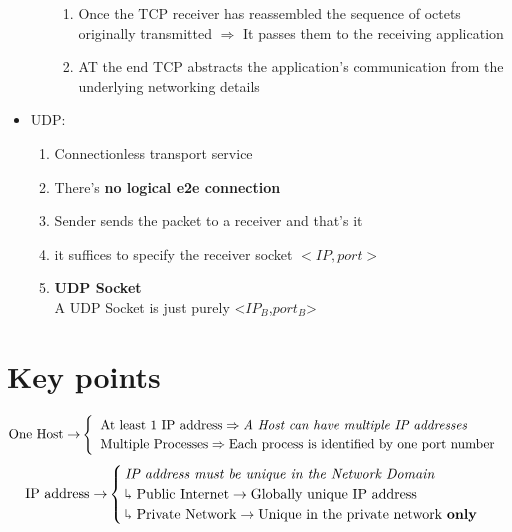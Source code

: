 \begin{itemize}
\begin{enumerate}
\begin{enumerate}
\item Once the TCP receiver has reassembled the sequence of octets originally transmitted $\Rightarrow$ It passes them to the receiving application
\item AT the end TCP abstracts the application's communication from the underlying networking details
\end{enumerate}
\end{enumerate}
\item UDP:
\begin{enumerate}
\item Connectionless transport service
\item There's \textbf{no logical e2e connection}
\item Sender sends the packet to a receiver and that's it
\item it suffices to specify the receiver socket $<IP,port>$
\item
\begin{definition}{\textbf{UDP Socket}\\}
A UDP Socket is just purely <$IP_B$,$port_B$>
\end{definition}
\end{enumerate}
\end{itemize}

\section{Key points}
\begin{equation}{\text{One Host}\rightarrow}
\begin{cases}
\text{ At least 1 IP address} \Rightarrow \text{\emph{A Host can have multiple IP addresses}}\\
\text{ Multiple Processes} \Rightarrow \text{Each process is identified by one port number}
\end{cases}
\end{equation}
\begin{equation}{\text{IP address}\rightarrow}
\begin{cases}
\text{\emph{IP address must be unique in the Network Domain}}\\
\curarr \text{ 		Public Internet} \rightarrow \text{Globally unique IP address}\\
\curarr \text{ 		Private Network} \rightarrow \text{Unique in the private network \textbf{only}}
\end{cases}
\end{equation}

